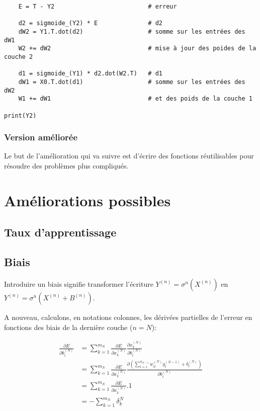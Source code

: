 \documentclass[11pt]{article}
\begin{document}
{\begin{verbatim}
    E = T - Y2                          # erreur

    d2 = sigmoide_(Y2) * E              # d2  
    dW2 = Y1.T.dot(d2)                  # somme sur les entrées des dW1
    W2 += dW2                           # mise à jour des poides de la couche 2

    d1 = sigmoide_(Y1) * d2.dot(W2.T)   # d1 
    dW1 = X0.T.dot(d1)                  # somme sur les entrées des dW2
    W1 += dW1                           # et des poids de la couche 1

print(Y2)
\end{verbatim}

\subsubsection{Version améliorée}
\label{sec-6-2-2}

Le but de l'amélioration qui va suivre est d'écrire des fonctions réutilisables
pour résoudre des problèmes plus compliqués.

\section{Améliorations possibles}
\label{sec-7}

\subsection{Taux d'apprentissage}
\label{sec-7-1}

\subsection{Biais}
\label{sec-7-2}

Introduire un biais signifie transformer l'écriture
$Y^{(n)}=\sigma^{n}(X^{(n)})$ en $Y^{(n)}=\sigma^{n}(X^{(n)}+B^{(n)})$.

A nouveau, calculons, en notations colonnes, les dérivées partielles de l'erreur
en fonctions des biais de la dernière couche ($n=N$):

\begin{align}
\frac{\partial E}{\partial b_{i}^{(N)}}
& = \sum_{k=1}^{m_{N}}\frac{\partial E}{\partial x_{k}^{(N)}}
\frac{\partial x_{k}^{(N)}}{\partial b_{i}^{(N)}}\\
& = \sum_{k=1}^{m_{N}}\frac{\partial E}{\partial x_{k}^{(N)}}
\frac{\partial (\sum_{l=1}^{n_{N-1}}w_{il}^{(N)}y_{l}^{(N-1)}+b_{l}^{(N)})}
{\partial b_{i}^{(N)}}\\
& = \sum_{k=1}^{m_{N}}\frac{\partial E}{\partial x_{k}^{(N)}}.1\\
& = -\sum_{k=1}^{m_{N}}\delta_{k}^{N}
\end{align}

}
\end{document}

